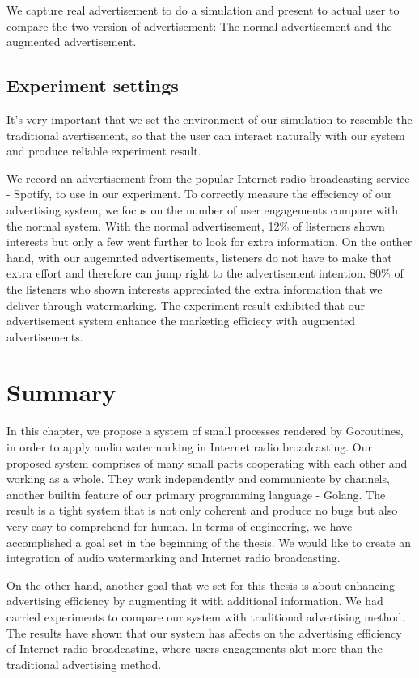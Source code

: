 We capture real advertisement to do a simulation and present to actual user to compare the two version of advertisement: The normal advertisement and the augmented advertisement.
\subsection{Experiment settings}
It's very important that we set the environment of our simulation to resemble the traditional avertisement, so that the user can interact naturally with our system and produce reliable experiment result.

We record an advertisement from the popular Internet radio broadcasting service - Spotify\cite{spotify}, to use in our experiment. To correctly measure the effeciency of our advertising system, we focus on the number of user engagements compare with the normal system. With the normal advertisement, 12\% of listerners shown interests but only a few went further to look for extra information. On the onther hand, with our augemnted advertisements, listeners do not have to make that extra effort and therefore can jump right to the advertisement intention. 80\% of the listeners who shown interests appreciated the extra information that we deliver through watermarking. The experiment result exhibited that our advertisement system enhance the marketing efficiecy with augmented advertisements.

\section{Summary}
In this chapter, we propose a system of small processes rendered by Goroutines, in order to apply audio watermarking in Internet radio broadcasting. Our proposed system comprises of many small parts cooperating with each other and working as a whole. They work independently and communicate by channels, another builtin feature of our primary programming language - Golang. The result is a tight system that is not only coherent and produce no bugs but also very easy to comprehend for human. In terms of engineering, we have accomplished a goal set in the beginning of the thesis. We would like to create an integration of audio watermarking and Internet radio broadcasting.

On the other hand, another goal that we set for this thesis is about enhancing advertising efficiency by augmenting it with additional information. We had carried experiments to compare our system with traditional advertising method. The results have shown that our system has affects on the advertising efficiency of Internet radio broadcasting, where users engagements alot more than the traditional advertising method.